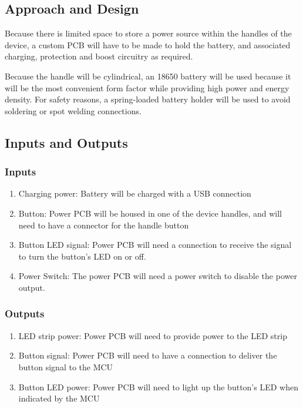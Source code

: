 \documentclass{notes}
\begin{document}
\subsection{Approach and Design}

Because there is limited space to store a power source within the handles of the device, a custom PCB will have to be made to hold the battery, and associated charging, protection and boost circuitry as required.

Because the handle will be cylindrical, an 18650 battery will be used because it will be the most convenient form factor while providing high power and energy density.
For safety reasons, a spring-loaded battery holder will be used to avoid soldering or spot welding connections.

\subsection{Inputs and Outputs}

\subsubsection{Inputs}

\begin{enumerate}
    \item Charging power: Battery will be charged with a USB connection
    \item Button: Power PCB will be housed in one of the device handles, and will need to have a connector for the handle button
    \item Button LED signal: Power PCB will need a connection to receive the signal to turn the button's LED on or off.
    \item Power Switch: The power PCB will need a power switch to disable the power output.
\end{enumerate}

\subsubsection{Outputs}

\begin{enumerate}
    \item LED strip power: Power PCB will need to provide power to the LED strip
    \item Button signal: Power PCB will need to have a connection to deliver the button signal to the MCU
    \item Button LED power: Power PCB will need to light up the button's LED when indicated by the MCU
\end{enumerate}
\end{document}
